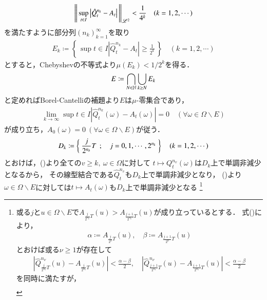 \begin{prf}
\begin{description}
\begin{align}
					\left\|\, \operatorname*{sup}_{t \in I} \left| \hat{Q}_t^{n_k} - A_t \right|\, \right\|_{\mathscr{L}^2} < \frac{1}{4^k} \quad (k=1,2,\cdots)
				\end{align}
				を満たすように部分列$(n_k)_{k=1}^{\infty}$を取り
				\begin{align}
					E_k \coloneqq \left\{\, \sup{t \in I}{\left| \hat{Q}_t^{n_k} - A_t \right|} \geq \frac{1}{2^k} \, \right\} \quad (k=1,2,\cdots)
				\end{align}
				とすると，Chebyshevの不等式より$\mu(E_k) < 1/2^k$を得る．
				\begin{align}
					E \coloneqq \bigcap_{N \in \mathbb{N}} \bigcup_{k \geq N} E_k
				\end{align}
				と定めればBorel-Cantelliの補題より$E$は$\mu$-零集合であり，
				\begin{align}
					\lim_{k \to \infty}\sup{t \in I}{\left| \hat{Q}_t^{n_k}(\omega) - A_t(\omega) \right|} = 0 
					\quad (\forall \omega \in \Omega \backslash E)
					\label{eq:thm_quadratic_variation_1}
				\end{align}
				が成り立ち，$A_0(\omega) = 0 \ (\forall \omega \in \Omega \backslash E)$が従う．
				\begin{align}
					D_k \coloneqq \left\{\ \frac{j}{2^{n_k}}T\ \, ; \quad  j = 0,1,\cdots,2^{n_k} \ \right\} \quad (k=1,2,\cdots)
				\end{align}
				とおけば，()より全ての$v \geq k,\ \omega \in \Omega$に対して
				$t \longmapsto Q_t^{n_v}(\omega)$は$D_k$上で単調非減少となるから，
				その線型結合である$\hat{Q}_t^{n_v}$も$D_k$上で単調非減少となり，
				()より
				$\omega \in \Omega \backslash E$に対しては$t \longmapsto A_t(\omega)$も$D_k$上で単調非減少となる
				\footnote{
					或る$j$と$u \in \Omega \backslash E$で$A_{\frac{j}{2^{n_k}}T}(u) > A_{\frac{j+1}{2^{n_k}}T}(u)$が成り立っているとする．
					式()により，
					\begin{align}
						\alpha \coloneqq A_{\frac{j}{2^n}T}(u),
						\quad \beta \coloneqq A_{\frac{j+1}{2^n}T}(u)
					\end{align}
					とおけば或る$\nu \geq 1$が存在して
					\begin{align}
						\left| \hat{Q}_{\frac{j}{2^{n_k}}T}^{n_\nu}(u) - A_{\frac{j}{2^{n_k}}T}(u) \right| < \frac{\alpha - \beta}{2},
						\quad \left| \hat{Q}_{\frac{j+1}{2^{n_k}}T}^{n_\nu}(u) - A_{\frac{j+1}{2^{n_k}}T}(u) \right| < \frac{\alpha - \beta}{2}
					\end{align}
					を同時に満たすが，
					\begin{align}

\end{align}}
\end{description}
\end{prf}
